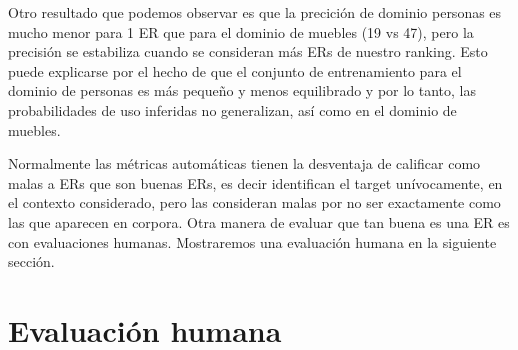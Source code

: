 Otro resultado que podemos observar es que la precici\'on de dominio personas es mucho menor para 1 ER que para el dominio de muebles (19 vs 47), pero la precisi\'on se estabiliza cuando se consideran m\'as ERs de nuestro ranking. Esto puede explicarse por el hecho de que el conjunto de entrenamiento para el dominio de personas es m\'as peque\~no y menos equilibrado y por lo tanto, las probabilidades de uso inferidas no generalizan, as\'{i} como en el dominio de muebles.

Normalmente las m\'etricas autom\'aticas tienen la desventaja de calificar como malas a ERs que son buenas ERs, es decir identifican el target un\'ivocamente, en el contexto considerado, pero las consideran malas por no ser exactamente como las que aparecen en corpora. Otra manera de evaluar que tan buena es una ER es con evaluaciones humanas. Mostraremos una evaluaci\'on humana en la siguiente secci\'on.

 

\section{Evaluaci\'on humana} \label{sec:humanevaluation}




